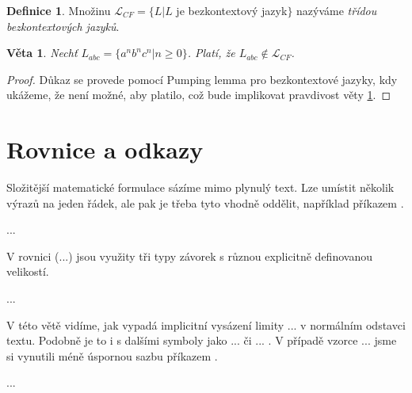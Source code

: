 \documentclass[11pt, a4paper, twocolumn]{article}
\theoremstyle{definition}
\newtheorem{definice}{Definice}[section]
\theoremstyle{plain}
\newtheorem{veta}{Věta}
\begin{document}
	\begin{definice}
	Množinu $\mathcal{L}_{CF} = \{L|L$ je bezkontextový jazyk$\}$ nazýváme \emph{třídou bezkontextových jazyků}.
	\end{definice}

	\begin{veta} \label{veta1}
	Nechť $L_{abc} = \{a^n b^n c^n | n \geq 0\}$. Platí, že $L_{abc} \notin \mathcal{L}_{CF}$.
	\end{veta}

	\begin{proof}
	Důkaz se provede pomocí Pumping lemma pro bezkontextové jazyky, kdy ukážeme, že není možné, aby platilo, což bude implikovat pravdivost věty \ref{veta1}.
	\end{proof}

	\section{Rovnice a odkazy}
	Složitější matematické formulace sázíme mimo plynulý text. Lze umístit několik výrazů na jeden řádek, ale pak je třeba tyto vhodně oddělit, například příkazem \quad. 

	...

	V rovnici (...) jsou využity tři typy závorek s různou explicitně definovanou velikostí.

	...

	V této větě vidíme, jak vypadá implicitní vysázení limity ... v normálním odstavci textu. Podobně je to i s dalšími symboly jako ... či ... . V případě vzorce ... jsme si vynutili méně úspornou sazbu příkazem \limits.

	...
\end{document}
